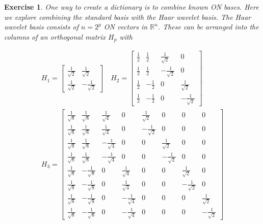 \documentclass[12pt]{article}
\theoremstyle{colon}
\newtheorem{exercise}{Exercise}
\begin{document}
\begin{exercise}
  One way to create a dictionary is to combine known ON bases. Here we explore combining the standard basis with the Haar wavelet basis. The Haar wavelet basis consists of $n = 2^p$ ON vectors in $\mathbb{R}^n$. These can be arranged into the columns of an orthogonal matrix $H_p$ with

  \begin{gather*}
    H_1 = \begin{bmatrix} 
      \frac{1}{\sqrt{2}} & \frac{1}{\sqrt{2}} \\
      \frac{1}{\sqrt{2}} & -\frac{1}{\sqrt{2}}
    \end{bmatrix} \quad
    H_2 = \begin{bmatrix} 
      \frac{1}{2} & \frac{1}{2} & \frac{1}{\sqrt{2}} & 0 \\
      \frac{1}{2} & \frac{1}{2} & -\frac{1}{\sqrt{2}} & 0 \\
      \frac{1}{2} & -\frac{1}{2} & 0 & \frac{1}{\sqrt{2}} \\
      \frac{1}{2} & -\frac{1}{2} & 0 & -\frac{1}{\sqrt{2}}
    \end{bmatrix} \\
    H_3 = \begin{bmatrix} 
      \frac{1}{\sqrt{8}} & \frac{1}{\sqrt{8}} & \frac{1}{\sqrt{4}} & 0 & \frac{1}{\sqrt{2}} & 0 & 0 & 0 \\
      \frac{1}{\sqrt{8}} & \frac{1}{\sqrt{8}} & \frac{1}{\sqrt{4}} & 0 & -\frac{1}{\sqrt{2}} & 0 & 0 & 0 \\
      \frac{1}{\sqrt{8}} & \frac{1}{\sqrt{8}} & -\frac{1}{\sqrt{4}} & 0 & 0 & \frac{1}{\sqrt{2}} & 0 & 0 \\
      \frac{1}{\sqrt{8}} & \frac{1}{\sqrt{8}} & -\frac{1}{\sqrt{4}} & 0 & 0 & -\frac{1}{\sqrt{2}} & 0 & 0 \\
      \frac{1}{\sqrt{8}} & -\frac{1}{\sqrt{8}} & 0 & \frac{1}{\sqrt{4}} & 0 & 0 & \frac{1}{\sqrt{2}} & 0 \\
      \frac{1}{\sqrt{8}} & -\frac{1}{\sqrt{8}} & 0 & \frac{1}{\sqrt{4}} & 0 & 0 & -\frac{1}{\sqrt{2}} & 0 \\
      \frac{1}{\sqrt{8}} & -\frac{1}{\sqrt{8}} & 0 & -\frac{1}{\sqrt{4}} & 0 & 0 & 0 & \frac{1}{\sqrt{2}} \\
      \frac{1}{\sqrt{8}} & -\frac{1}{\sqrt{8}} & 0 & -\frac{1}{\sqrt{4}} & 0 & 0 & 0 & -\frac{1}{\sqrt{2}}
    \end{bmatrix}
  \end{gather*}


\end{exercise}
\end{document}
